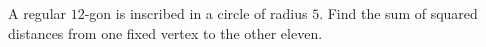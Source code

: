 A regular $12$-gon is inscribed in a circle of radius $5$. Find the sum of squared distances from one fixed vertex to the other eleven.
